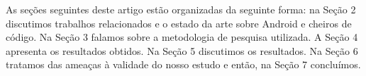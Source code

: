 
As se\c{c}\~oes seguintes deste artigo est\~ao organizadas da seguinte forma: na Se\c{c}\~ao 2 discutimos trabalhos relacionados e o estado da arte sobre Android e cheiros de c\'odigo. Na Se\c{c}\~ao 3 falamos sobre a metodologia de pesquisa utilizada. A Se\c{c}\~ao 4 apresenta os resultados obtidos. Na Se\c{c}\~ao 5 discutimos os resultados. Na Se\c{c}\~ao 6 tratamos das amea\c{c}as \`a validade do nosso estudo e ent\~ao, na Se\c{c}\~ao 7 conclu\'imos.
